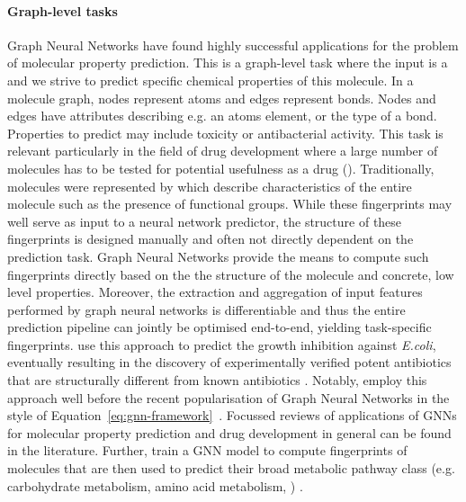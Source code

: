 \documentclass[
	fontsize=10pt, %
	twoside=true, %
	secnumdepth=1, %
  toc=indentunnumbered %
]{kaobook}
\begin{document}
\paragraph{Graph-level tasks} Graph Neural Networks have found highly successful
applications for the problem of molecular property prediction. This is a
graph-level task where the input is a  and we strive to
predict specific chemical properties of this molecule. In a molecule graph,
nodes represent atoms and edges represent bonds. Nodes and edges have attributes
describing e.g. an atoms element, or the type of a bond. Properties to predict
may include toxicity or antibacterial activity. This task is relevant
particularly in the field of drug development where a large number of molecules
has to be tested for potential usefulness as a drug ().
%
Traditionally, molecules were represented by  which
describe characteristics of the entire molecule such as the presence of
functional groups. While these fingerprints may well serve as input to a neural
network predictor, the structure of these fingerprints is designed manually and
often not directly dependent on the prediction task.
Graph Neural Networks provide the means to compute such fingerprints directly
based on the the structure of the molecule and concrete, low level properties.
Moreover, the extraction and aggregation of input features performed by graph
neural networks is differentiable and thus the entire prediction pipeline can
jointly be optimised end-to-end, yielding task-specific fingerprints.
\citeauthor{stokes_DeepLearningApproach_2020} use this approach to predict the
growth inhibition against \textit{E.coli}, eventually resulting in the discovery
of experimentally verified potent antibiotics that are structurally different
from known antibiotics \cite{stokes_DeepLearningApproach_2020}.
%
Notably, \citeauthor{duvenaud_convolutional_2015} employ this approach well
before the recent popularisation of Graph Neural Networks in the style of  
Equation~\ref{eq:gnn-framework}~\cite{duvenaud_convolutional_2015}.
Focussed reviews of applications of GNNs for molecular property prediction
\cite{wieder_CompactReviewMolecular_2020}
and drug development in general
\cite{gaudelet_utilising_2020}
can be found in the literature.
%
Further, \citeauthor{baranwal_deep_2020} train a GNN model to compute
fingerprints of molecules that are then used to predict their broad metabolic
pathway class (e.g. carbohydrate metabolism, amino acid metabolism, \etc)
\cite{baranwal_deep_2020}.
\end{document}
